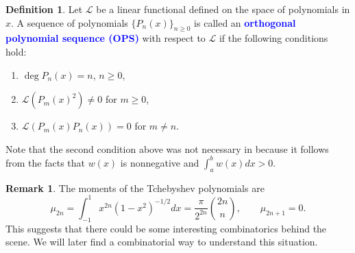 \documentclass{amsart}
\numberwithin{equation}{section}
\theoremstyle{definition}
\newtheorem{defn}[thm]{Definition}
\newtheorem{remark}[thm]{Remark}
\newcommand\LL{\mathcal{L}}
\renewcommand\emph[1]{\textcolor{blue}{\bf #1}}
\begin{document}
\begin{defn}\label{def:OPS2}
  Let \( \LL \) be a linear functional defined on the space of
  polynomials in \( x \). A sequence of polynomials
  \( \{P_n(x)\}_{n\ge0} \) is called an \emph{orthogonal polynomial
    sequence (OPS)} with respect to \( \LL \) if the following
  conditions hold:
  \begin{enumerate}
  \item \( \deg P_n(x) = n \), \( n\ge0 \),
  \item \( \LL(P_m(x)^2) \ne 0 \) for \( m\ge0 \),
  \item \( \LL(P_m(x)P_n(x))  = 0 \) for \( m\ne n \).
  \end{enumerate}
\end{defn}

Note that the second condition above was not necessary in
 because it follows from the facts that \( w(x) \) is
nonnegative and \( \int_a^b w(x)dx >0 \).

\begin{remark}
  The moments of the Tchebyshev polynomials are
  \[
    \mu_{2n} = \int_{-1}^1 x^{2n} (1-x^2)^{-1/2} dx
    = \frac{\pi}{2^{2n}} \binom{2n}{n}, \qquad
    \mu_{2n+1} = 0.
  \]
  This suggests that there could be some interesting combinatorics
  behind the scene. We will later find a combinatorial way to
  understand this situation.
\end{remark}
\end{document}
